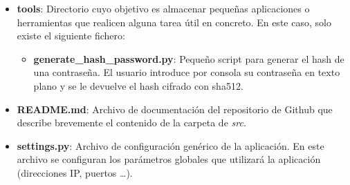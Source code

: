 \begin{itemize}
\begin{itemize}
	\end{itemize}

\item \textbf{tools}: Directorio cuyo objetivo es almacenar pequeñas aplicaciones o herramientas que realicen alguna tarea útil en concreto. En este caso, solo existe el siguiente fichero:
	\begin{itemize}
	\item \textbf{generate\_hash\_password.py}: Pequeño script para generar el hash de una contraseña. El usuario introduce por consola su contraseña en texto plano y se le devuelve el hash cifrado con sha512.
	\end{itemize}

\item \textbf{README.md}: Archivo de documentación del repositorio de Github que describe brevemente el contenido de la carpeta de \textit{src}.

\item \textbf{settings.py}: Archivo de configuración genérico de la aplicación. En este archivo se configuran los parámetros globales que utilizará la aplicación (direcciones IP, puertos \ldots).

\end{itemize}

